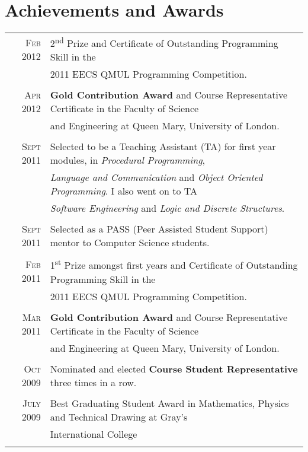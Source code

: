 \documentclass[a4paper,10pt]{article}
\begin{document}
\section{Achievements and Awards}
\begin{tabular}{rl}
  \textsc{Feb} 2012 & 2\textsuperscript{nd}  Prize and Certificate of Outstanding Programming Skill
  in the\\& 2011 EECS QMUL Programming Competition.\\\\

  \textsc{Apr} 2012 & \textbf{Gold Contribution Award} and Course Representative Certificate in the
  Faculty of Science\\& and Engineering at Queen Mary, University of London.\\\\

  \textsc{Sept} 2011 & Selected to be a Teaching Assistant (TA) for first year modules, in
  \textit{Procedural Programming},\\& \textit{Language and  Communication} and \textit{Object
  Oriented Programming}. I also went on to TA\\& \textit{Software Engineering} and \textit{Logic
  and Discrete Structures}.\\\\

  \textsc{Sept} 2011 & Selected as a PASS (Peer Assisted Student Support) mentor to Computer Science
  students.\\\\

  \textsc{Feb} 2011 & 1\textsuperscript{st} Prize amongst first years and Certificate of Outstanding Programming
  Skill in the\\& 2011 EECS QMUL Programming Competition.\\\\

  \textsc{Mar} 2011 & \textbf{Gold Contribution Award} and Course Representative Certificate in the
  Faculty of Science\\& and Engineering at Queen Mary, University of London.\\\\

  \textsc{Oct} 2009 & Nominated and elected \textbf{Course Student Representative} three times in a
  row.\\\\

  \textsc{July} 2009 & Best Graduating Student Award in Mathematics, Physics and Technical Drawing
  at Gray’s\\& International College\\\\


\end{tabular}
\end{document}

